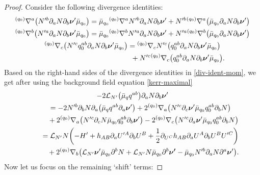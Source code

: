 \documentclass[pdftex]{sigma}
\def\ptl{\partial}%
\def\mbo#1{\boldsymbol{#1}}%
\def\grad{{\nabla}}%
\newcommand{\leftexp}[2]{{\vphantom{#2}}^{#1}{#2}}
\def\halb{\frac{1}{2}}%
\numberwithin{equation}{section}
\begin{document}
\begin{proof}
Consider the following divergence identities:
\begin{subequations} \label{div-ident-mom}
\begin{gather}
\leftexp{(q_0)}{\grad}^a \bigl(N'^b \ptl_a N \ptl_b \mbo{\nu}' \bar{\mu}_{q_0}\bigr)= \bar{\mu}_{q_0} \leftexp{(q_0)}{\grad}^a N'^b \ptl_a N \ptl_b \mbo{\nu}' + N'^b \leftexp{(q_0)}{\grad}^a \bigl(\bar{\mu}_{q_0} \ptl_a N \ptl_b \mbo{\nu}'\bigr) \\
\leftexp{(q_0)}{\grad}^b \bigl(N'^a \ptl_a N \ptl_b \mbo{\nu}' \bar{\mu}_{q_0}\bigr)= \bar{\mu}_{q_0} \leftexp{(q_0)}{\grad}^b N'^a \ptl_a N \ptl_b \mbo{\nu}' + N'^a \leftexp{(q_0)}{\grad}^b \bigl(\bar{\mu}_{q_0} \ptl_a N \ptl_b \mbo{\nu}'\bigr) \\
\leftexp{(q_0)}{\grad}_c \bigl(N'^c q^{ab}_0 \ptl_a N \ptl_b \mbo{\nu}' \bar{\mu}_{q_0}\bigr)= \leftexp{(q_0)}{\grad}_c N'^c\bigl(q^{ab}_0 \ptl_a N \ptl_b \mbo{\nu}' \bar{\mu}_{q_0}\bigr)\nonumber\\ \hphantom{\leftexp{(q_0)}{\grad}_c \bigl(N'^c q^{ab}_0 \ptl_a N \ptl_b \mbo{\nu}' \bar{\mu}_{q_0}\bigr)=}{}
+ N'^c \leftexp{(q_0)}{\grad}_c \bigl(q^{ab}_0 \ptl_a N \ptl_b \mbo{\nu}' \bar{\mu}_{q_0}\bigr).
\end{gather}
\end{subequations}
Based on the right-hand sides of the divergence identities in \eqref{div-ident-mom}, we get after using the background field equation \eqref{kerr-maximal}
\begin{gather*}
-2 \mathcal{L}_{N'} \bigl(\bar{\mu}_q q^{ab}\bigr) \ptl_a N \ptl_b \mbo{\nu}' \notag\\
\qquad{}= -2 N'^b \ptl_b N \ptl_a \bigl(\bar{\mu}_q q^{ab} \ptl_a \mbo{\nu}'\bigr) + 2 \leftexp{(q_0)}{\grad}_a \bigl(N'^c \ptl_c \mbo{\nu}' \bar{\mu}_{q_0} q^{ab}_0 \ptl_b N\bigr) \notag\\
\qquad\quad{} + 2 \leftexp{(q_0)}{\grad}_a \bigl(N'^c \ptl_c N \bar{\mu}_{q_0} q^{ab}_0 \ptl_b \mbo{\nu}'\bigr) - 2 \leftexp{(q_0)}{\grad}_c \bigl(N'^c \ptl_a \mbo{\nu}' \bar{\mu}_{q_0} q^{ab}_0 \ptl_b N\bigr) \notag\\
\qquad{}= \mathcal{L}_{N'} N \biggl(- H' + h_{AB} \ptl_a U'^A \ptl_b U^B + \halb \ptl_{U^C} h_{AB} \ptl_a U^A \ptl_b U^B U'^C\biggr) \notag\\
\qquad\quad{} + 2 \leftexp{(q_0)}{\grad}_b \bigl(\mathcal{L}_{N'} \mbo{\nu}' \bar{\mu}_{q_0} \ptl^b N+ \mathcal{L}_{N'} N \bar{\mu}_{q_0} \ptl^b \mbo{\nu'} - \bar{\mu}_{q_0} N'^b \ptl_a N \ptl^a \mbo{\nu}'\bigr).
\end{gather*}
Now let us focus on the remaining `shift' terms:

\end{proof}
\end{document}
